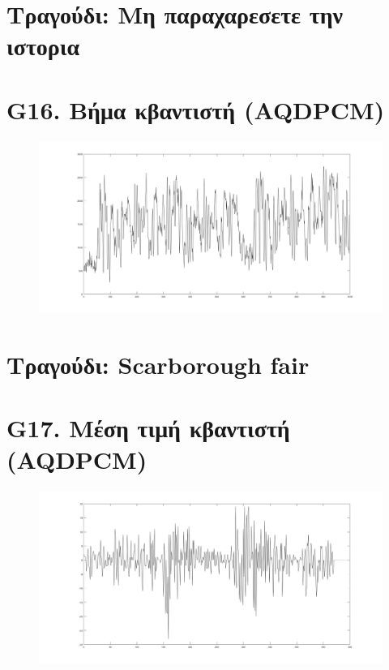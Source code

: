 \documentclass{article}
\begin{document}
\section*{Τραγούδι: Μη παραχαρεσετε την ιστορια}
\section*{G16. Βήμα κβαντιστή (AQDPCM) }
\begin{figure}[h!]
 \begin{center}
 \advance\leftskip-6cm
  \includegraphics[width=230mm,scale=0.7]{g16s2.jpg}
\end{center}
\end{figure}
\newpage
\section*{Τραγούδι: Scarborough fair}
\section*{G17. Μέση τιμή κβαντιστή (AQDPCM) }
\begin{figure}[h!]
 \begin{center}
 \advance\leftskip-6cm
  \includegraphics[width=230mm,scale=0.7]{g17s2.jpg}
\end{center}
\end{figure}
\newpage
\end{document}
